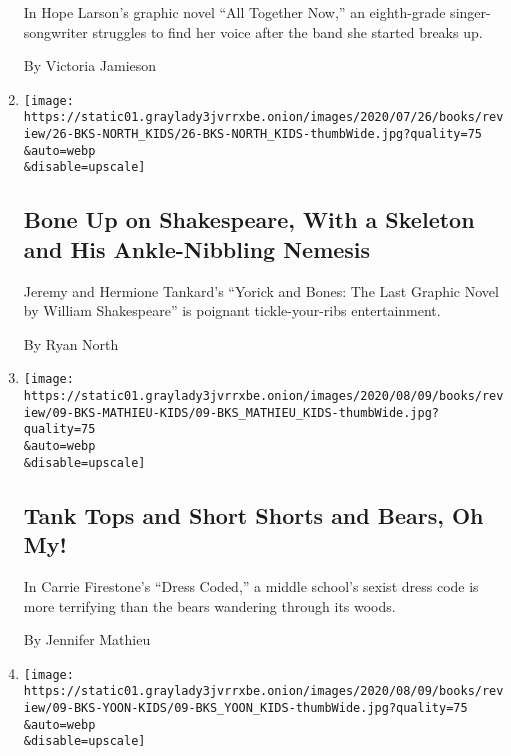 \begin{enumerate}
  In Hope Larson's graphic novel ``All Together Now,'' an eighth-grade
  singer-songwriter struggles to find her voice after the band she
  started breaks up.

  By Victoria Jamieson
\item
  \href{/2020/08/15/books/review/tankard-jeremy-hermione-yorick-and-bones.html}{}

  \texttt{[image: https://static01.graylady3jvrrxbe.onion/images/2020/07/26/books/review/26-BKS-NORTH\_KIDS/26-BKS-NORTH\_KIDS-thumbWide.jpg?quality=75\\\&auto=webp\\\&disable=upscale]}

  \hypertarget{bone-up-on-shakespeare-with-a-skeleton-and-his-ankle-nibbling-nemesis}{%
  \subsection{Bone Up on Shakespeare, With a Skeleton and His
  Ankle-Nibbling
  Nemesis}\label{bone-up-on-shakespeare-with-a-skeleton-and-his-ankle-nibbling-nemesis}}

  Jeremy and Hermione Tankard's ``Yorick and Bones: The Last Graphic
  Novel by William Shakespeare'' is poignant tickle-your-ribs
  entertainment.

  By Ryan North
\item
  \href{/2020/08/01/books/review/carrie-firestone-dress-coded.html}{}

  \texttt{[image: https://static01.graylady3jvrrxbe.onion/images/2020/08/09/books/review/09-BKS-MATHIEU-KIDS/09-BKS\_MATHIEU\_KIDS-thumbWide.jpg?quality=75\\\&auto=webp\\\&disable=upscale]}

  \hypertarget{tank-tops-and-short-shorts-and-bears-oh-my}{%
  \subsection{Tank Tops and Short Shorts and Bears, Oh
  My!}\label{tank-tops-and-short-shorts-and-bears-oh-my}}

  In Carrie Firestone's ``Dress Coded,'' a middle school's sexist dress
  code is more terrifying than the bears wandering through its woods.

  By Jennifer Mathieu
\item
  \href{/2020/08/01/books/review/brandy-colbert-the-voting-booth.html}{}

  \texttt{[image: https://static01.graylady3jvrrxbe.onion/images/2020/08/09/books/review/09-BKS-YOON-KIDS/09-BKS\_YOON\_KIDS-thumbWide.jpg?quality=75\\\&auto=webp\\\&disable=upscale]}


\end{enumerate}
